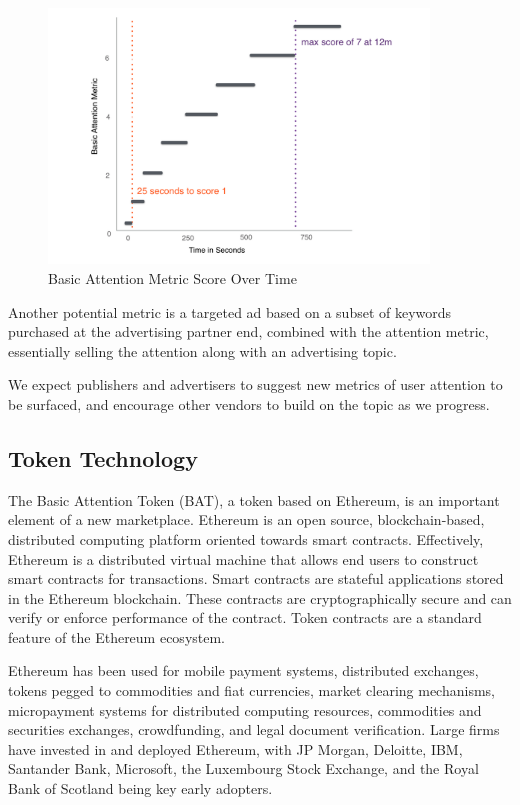\documentclass[11pt]{article}
\begin{document}
\begin{figure}
\begin{center}
\includegraphics[width=0.9\textwidth]{BAM_score_over_time.png}
\caption{Basic Attention Metric Score Over Time}
\label{fig:BAM}
\end{center}
\end{figure}


Another potential metric is a targeted ad based on a subset of keywords purchased at the advertising partner end, combined with the attention metric, essentially selling the attention along with an advertising topic. 

We expect publishers and advertisers to suggest new metrics of user attention to be surfaced, and encourage other vendors to build on the topic as we progress.
\subsection{Token Technology}
\label{sec-4-2}

The Basic Attention Token (\textrm{BAT}), a token based on Ethereum, is an important element of a new marketplace. Ethereum is an open source, blockchain-based, distributed computing platform oriented towards smart contracts. Effectively, Ethereum is a distributed virtual machine that allows end users to construct smart contracts for transactions. Smart contracts are stateful applications stored in the Ethereum blockchain. These contracts are cryptographically secure and can verify or enforce performance of the contract. Token contracts are a standard feature of the Ethereum ecosystem.

Ethereum has been used for mobile payment systems, distributed exchanges, tokens pegged to commodities and fiat currencies, market clearing mechanisms, micropayment systems for distributed computing resources, commodities and securities exchanges, crowdfunding, and legal document verification. Large firms have invested in and deployed Ethereum, with JP Morgan, Deloitte, IBM, Santander Bank, Microsoft, the Luxembourg Stock Exchange, and the Royal Bank of Scotland being key early adopters.
\end{document}
